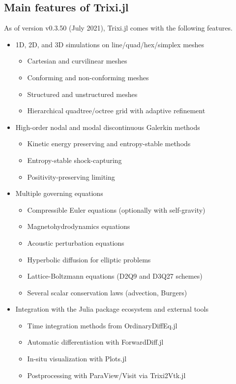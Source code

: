 \documentclass{juliacon}
\newcommand{\trixi}{Trixi.jl\xspace}
\begin{document}
\subsection{Main features of \trixi}

As of version v0.3.50 (July 2021), \trixi comes with the following features.
\begin{itemize}
  \item 1D, 2D, and 3D simulations on line/quad/hex/simplex meshes
  \begin{itemize}
    \item Cartesian and curvilinear meshes
    \item Conforming and non-conforming meshes
    \item Structured and unstructured meshes
    \item Hierarchical quadtree/octree grid with adaptive refinement
  \end{itemize}

  \item High-order nodal and modal discontinuous Galerkin methods
  \begin{itemize}
    \item Kinetic energy preserving and entropy-stable methods
    \item Entropy-stable shock-capturing
    \item Positivity-preserving limiting
  \end{itemize}

  \item Multiple governing equations
  \begin{itemize}
    \item Compressible Euler equations (optionally with self-gravity)
    \item Magnetohydrodynamics equations
    \item Acoustic perturbation equations
    \item Hyperbolic diffusion for elliptic problems
    \item Lattice-Boltzmann equations (D2Q9 and D3Q27 schemes)
    \item Several scalar conservation laws (advection, Burgers)
  \end{itemize}

  \item Integration with the Julia package ecosystem and external tools
  \begin{itemize}
    \item Time integration methods from OrdinaryDiffEq.jl
    \item Automatic differentiation with ForwardDiff.jl
    \item In-situ visualization with Plots.jl
    \item Postprocessing with ParaView/Visit via Trixi2Vtk.jl
  \end{itemize}
\end{itemize}
\end{document}
